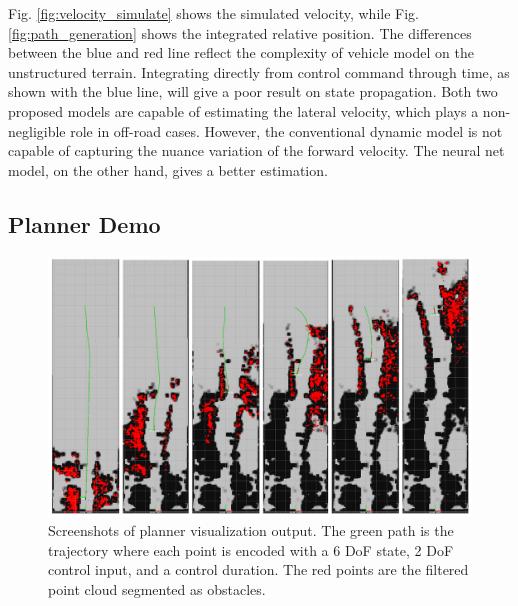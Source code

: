 \documentclass[../thesis.tex]{subfiles}
\begin{document}
Fig. \ref{fig:velocity_simulate} shows the simulated velocity, while Fig. \ref{fig:path_generation} shows the integrated relative position.
The differences between the blue and red line reflect the complexity of vehicle model on the unstructured terrain. 
Integrating directly from control command through time, as shown with the blue line, will give a poor result on state propagation.
Both two proposed models are capable of estimating the lateral velocity, which plays a non-negligible role in off-road cases.
However, the conventional dynamic model is not capable of capturing the nuance variation of the forward velocity. 
The neural net model, on the other hand, gives a better estimation.

 
 
\subsection{Planner Demo}
 
\begin{figure}[t]
    	\begin{center}
    	 \centerline{\includegraphics[width=0.8\columnwidth]{./RRTPlanner/fig/demo.png}}
           	\caption{Screenshots of planner visualization output. The green path is the trajectory where each point is encoded with a 6 DoF state, 2 DoF control input, and a control duration. The red points are the filtered point cloud segmented as obstacles.}
           	\label{fig:demo}
    	\end{center}
\end{figure}
 
\end{document}
